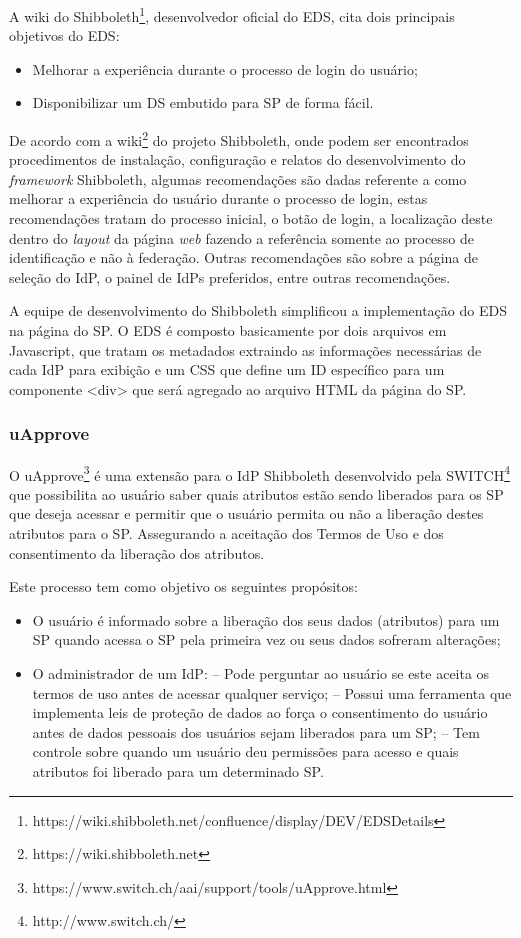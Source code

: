 A wiki do Shibboleth\footnote{https://wiki.shibboleth.net/confluence/display/DEV/EDSDetails}, desenvolvedor oficial do EDS, cita dois principais objetivos do EDS:

\begin{itemize}
  \item Melhorar a experiência durante o processo de login do usuário;
  \item Disponibilizar um DS embutido para SP de forma fácil.
\end{itemize}

De acordo com a wiki\footnote{https://wiki.shibboleth.net} do projeto Shibboleth, onde podem ser encontrados procedimentos de instalação, configuração e relatos do desenvolvimento do \textit{framework} Shibboleth, algumas recomendações são dadas referente a como melhorar a experiência do usuário durante o processo de login, estas recomendações tratam do processo inicial, o botão de login, a localização deste dentro do \textit{layout} da página \textit{web} fazendo a referência somente ao processo de identificação e não à federação. Outras recomendações são sobre a página de seleção do IdP, o painel de IdPs preferidos, entre outras recomendações.

A equipe de desenvolvimento do Shibboleth simplificou a implementação do EDS na página do SP. O EDS é composto basicamente por dois arquivos em Javascript, que tratam os metadados extraindo as informações necessárias de cada IdP para exibição e um \ac{CSS} que define um ID específico para um componente <div> que será agregado ao arquivo HTML da página do SP.

\subsubsection{uApprove}

O uApprove\footnote{https://www.switch.ch/aai/support/tools/uApprove.html} é uma extensão para o IdP Shibboleth desenvolvido pela SWITCH\footnote{http://www.switch.ch/} que possibilita ao usuário saber quais atributos estão sendo liberados para os SP que deseja acessar e permitir que o usuário permita ou não a liberação destes atributos para o SP. Assegurando a aceitação dos Termos de Uso e dos consentimento da liberação dos atributos.

Este processo tem como objetivo os seguintes propósitos:

\begin{itemize}
	\item O usuário é informado sobre a liberação dos seus dados (atributos) para um SP quando acessa o SP pela primeira vez ou seus dados sofreram alterações;
	\item O administrador de um IdP:
	\subitem -- Pode perguntar ao usuário se este aceita os termos de uso antes de acessar qualquer serviço;
	\subitem -- Possui uma ferramenta que implementa leis de proteção de dados ao força o consentimento do usuário antes de dados pessoais dos usuários sejam liberados para um SP;
	\subitem -- Tem controle sobre quando um usuário deu permissões para acesso e quais atributos foi liberado para um determinado SP.
\end{itemize}

